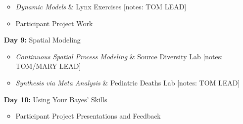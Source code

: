 \documentclass[11pt]{article}
\begin{document}
\begin{enumerate}
\begin{itemize}
\item \emph{Dynamic Models} \& Lynx Exercises [notes: TOM LEAD]
\item Participant Project Work
\end{itemize}

\item[\textbf{Day 9:}] Spatial Modeling

\begin{itemize}
\item \emph{Continuous Spatial Process Modeling} \& Source Diversity Lab [notes: TOM/MARY LEAD]
\item \emph{Synthesis via Meta Analysis} \& Pediatric Deaths Lab [notes: TOM LEAD] 
\end{itemize}

\item[\textbf{Day 10:}] Using Your Bayes' Skills

\begin{itemize}
\item Participant Project Presentations and Feedback 
\end{itemize}

\end{enumerate}
\end{document}
